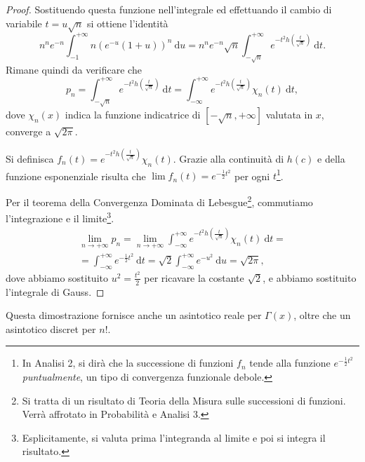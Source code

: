 \begin{proof}
	Sostituendo questa funzione nell'integrale ed effettuando il cambio di variabile $t=u\sqrt{n}$ si ottiene l'identità
	\begin{equation*}
		n^n e^{-n} \int^{+\infty}_{-1} n \left( e^{-u} (1+u) \right)^n \: \mathrm{d} u =
		n^n e^{-n} \sqrt{n} \int^{+\infty}_{-\sqrt{n}} e^{-t^2 h \left( \frac{t}{\sqrt{n}} \right)} \: \mathrm{d} t.
	\end{equation*}
	Rimane quindi da verificare che
	\begin{equation*}
		p_n = 
		\int^{+\infty}_{-\sqrt{n}} e^{-t^2 h \left( \frac{t}{\sqrt{n}} \right)} \: \mathrm{d}t = 
		\int^{+\infty}_{-\infty} e^{-t^2 h \left( \frac{t}{ \sqrt{n} } \right) } \chi_n(t) \: \mathrm{d} t,
	\end{equation*}
	dove $\chi_n( x )$ indica la funzione indicatrice di $\left[ -\sqrt{n} , +\infty \right]$ valutata in $x$, converge a $\sqrt{ 2 \pi }$.

	Si definisca $f_n (t) = e^{-t^2 h \left( \frac{t}{ \sqrt{n} } \right) } \chi_n (t)$. 
	Grazie alla continuità di $h(c)$ e della funzione esponenziale risulta che $\lim f_n (t) = e^{ -\frac{1}{2} t^2 }$ per ogni $t$\footnote{In Analisi 2, si dirà che la successione di funzioni $f_n$ tende alla funzione $e^{-\frac{1}{2}t^2}$ \textit{puntualmente}, un tipo di convergenza funzionale debole.}.

	Per il teorema della Convergenza Dominata di Lebesgue\footnote{Si tratta di un risultato di Teoria della Misura sulle successioni di funzioni. 
	Verrà affrotato in Probabilità e Analisi 3.}, commutiamo l'integrazione e il limite\footnote{Esplicitamente, si valuta prima l'integranda al limite e poi si integra il risultato.}.
	\goodbreak\begin{multline}
		\lim \limits_{n\to+\infty} p_n = 
		\lim \limits_{n\to+\infty} \int^{+\infty}_{-\infty} e^{-t^2 h \left( \frac{t}{ \sqrt{n} } \right) } \chi_n (t) \: \mathrm{d}t=\\
		= \int^{+\infty}_{-\infty} e^{ -\frac{1}{2} t^2 }\: \mathrm{d} t = 
		\sqrt{2} \int^{+\infty}_{-\infty} e^{-u^2} \: \mathrm{d} u =
		\sqrt{2 \pi},		
	\end{multline}
	dove abbiamo sostituito $u^2 = \frac{t^2}{2}$ per ricavare la costante $\sqrt{2}$, e abbiamo sostituito l'integrale di Gauss.
\end{proof}
Questa dimostrazione fornisce anche un asintotico reale per $\Gamma(x)$, oltre che un asintotico discret per $n!$.
\pagebreak